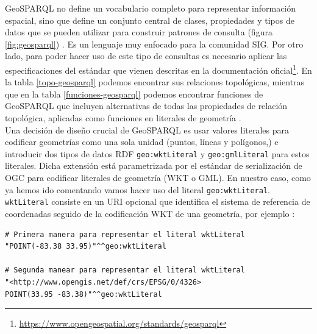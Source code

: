 GeoSPARQL no define un vocabulario completo para representar información espacial, sino que define un conjunto central de clases, propiedades y tipos de datos que se pueden utilizar para construir patrones de consulta (figura \ref{fig:geosparql}) \cite{ogc-geo}. Es un lenguaje muy enfocado para la comunidad SIG. Por otro lado, para poder hacer uso de este tipo de consultas es necesario aplicar las especificaciones del estándar que vienen descritas en la documentación oficial\footnote{\url{https://www.opengeospatial.org/standards/geosparql}}. En la tabla \ref{topo-geosparql} podemos encontrar sus relaciones topológicas, mientras que en la tabla \ref{funciones-geosparql} podemos encontrar funciones de GeoSPARQL que incluyen alternativas de todas las propiedades de relación topológica, aplicadas como funciones en literales de geometría \cite{tesis-otro}. \\

Una decisión de diseño crucial de GeoSPARQL es usar valores literales para codificar geometrías como una sola unidad (puntos, líneas y polígonos,) e introducir dos tipos de datos RDF \texttt{geo:wktLiteral} y \texttt{geo:gmlLiteral} para estos literales. Dicha extensión está parametrizada por el estándar de serialización de OGC para codificar literales de geometría (WKT o GML). En nuestro caso, como ya hemos ido comentando vamos hacer uso del literal  \texttt{geo:wktLiteral}. \texttt{wktLiteral} consiste en un URI opcional que identifica el sistema de referencia de coordenadas seguido de la codificación WKT de una geometría, por ejemplo \cite{wkt-database}: 

\begin{lstlisting}
# Primera manera para representar el literal wktLiteral
"POINT(-83.38 33.95)"^^geo:wktLiteral

# Segunda manear para representar el literal wktLiteral
"<http://www.opengis.net/def/crs/EPSG/0/4326>
POINT(33.95 -83.38)"^^geo:wktLiteral
\end{lstlisting}


